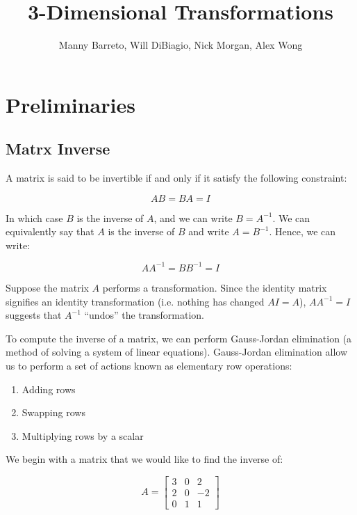 \documentclass[12pt,letterpaper]{article}
\title{3-Dimensional Transformations}
\author{Manny Barreto, Will DiBiagio, Nick Morgan, Alex Wong}
\date{}
\begin{document}
\maketitle

\section{Preliminaries}
\subsection{Matrx Inverse}
A matrix is said to be invertible if and only if it satisfy the following constraint:

\begin{equation}
   AB = BA = I
\end{equation}

In which case $B$ is the inverse of $A$, and we can write $B = A^{-1}$. We can equivalently say that $A$ is the inverse of $B$ and write $A = B^{-1}$. Hence, we can write:

\begin{equation}
   AA^{-1} = BB^{-1} = I
\end{equation}

Suppose the matrix $A$ performs a transformation. Since the identity matrix signifies an identity transformation (i.e. nothing has changed $AI = A$), $AA^{-1} = I$ suggests that $A^{-1}$ ``undos'' the transformation.

To compute the inverse of a matrix, we can perform Gauss-Jordan elimination (a method of solving a system of linear equations). Gauss-Jordan elimination allow us to perform a set of actions known as elementary row operations:
\begin{enumerate}
    \item Adding rows
    \item Swapping rows
    \item Multiplying rows by a scalar
\end{enumerate}

\newpage

We begin with a matrix that we would like to find the inverse of:

\begin{equation}
    A = \begin{bmatrix}
        3 & 0 &  2 \\
        2 & 0 & -2 \\
        0 & 1 & 1
        \end{bmatrix}
\end{equation}
\end{document}
